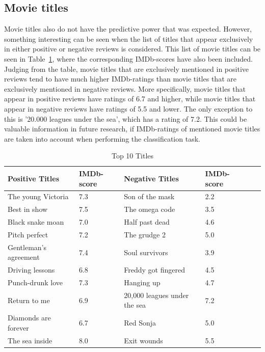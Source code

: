 \documentclass[
10pt, %
a4paper, %
oneside, %
headinclude,footinclude, %
] {book}%
\begin{document}
\subsection{Movie titles}

Movie titles also do not have the predictive power that was expected. However, something interesting can be seen when the list of titles that appear exclusively in either positive or negative reviews is considered. This list of movie titles can be seen in Table~\ref{Table 2}, where the corresponding IMDb-scores have also been included. Judging from the table, movie titles that are exclusively mentioned in positive reviews tend to have much higher IMDb-ratings than movie titles that are exclusively mentioned in negative reviews. More specifically, movie titles that appear in positive reviews have ratings of 6.7 and higher, while movie titles that appear in negative reviews have ratings of 5.5 and lower. The only exception to this is '20.000 leagues under the sea', which has a rating of 7.2. This could be valuable information in future research, if IMDb-ratings of mentioned movie titles are taken into account when performing the classification task.

\begin{center}
\begin{table}[hbtp]
\caption{Top 10 Titles}
\label{Table 2}
\begin{tabular}{llllll}
\toprule
Positive Titles        & IMDb-score & Negative Titles              &  IMDb-score \\ \midrule
The young Victoria          & 7.3        & Son of the mask                    & 2.2        \\
Best in show               & 7.5        & The omega code                    & 3.5        \\
Black snake moan            & 7.0        & Half past dead                    & 4.6        \\
Pitch perfect               & 7.2        & The grudge 2                      & 5.0        \\
Gentleman's agreement      & 7.4        & Soul survivors                    & 3.9        \\
Driving lessons             & 6.8        & Freddy got fingered                & 4.5        \\
Punch-drunk love            & 7.3        & Hanging up                         & 4.7        \\
Return to me                & 6.9        & 20,000 leagues under the sea      & 7.2        \\
Diamonds are forever        & 6.7        & Red Sonja                         & 5.0        \\
The sea inside              & 8.0        & Exit wounds                        & 5.5           \\ \bottomrule
\end{tabular}
\end{table}
\end{center}
\end{document}
